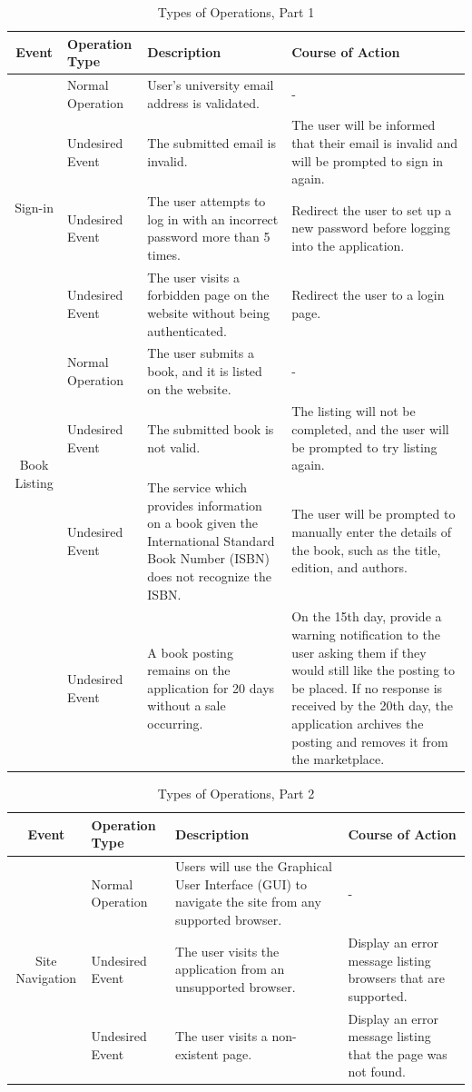 \documentclass[fullpage]{article}
\begin{document}
\begin{table}[H]
\flushleft
\begin{tabular}{|c|p{3cm}|p{4cm}|p{4cm}|}
\hline
 \rowcolor{lightgray} 
\textbf{Event} & \textbf{Operation Type} &\textbf{Description} &\textbf{Course of Action}\\
\hline
\multirow{4}{*}{Sign-in} & Normal Operation & User’s university email address is validated. & -\\
& Undesired Event & The submitted email is invalid. & The user will be informed that their email is invalid and will be prompted to sign in again.\\
& Undesired Event & The user attempts to log in with an incorrect password more than 5 times. & Redirect the user to set up a new password before logging into the application.\\
& Undesired Event & The user visits a forbidden page on the website without being authenticated. & Redirect the user to a login page.\\
\hline
\multirow{3}{*}{Book Listing}& Normal Operation &The user submits a book, and it is listed on the website.&-\\
& Undesired Event &The submitted book is not valid.&The listing will not be completed, and the user will be prompted to try listing again.\\
& Undesired Event &The service which provides information on a book given the International Standard Book Number (ISBN) does not recognize the ISBN.& The user will be prompted to manually enter the details of the book, such as the title, edition, and authors.\\
& Undesired Event &A book posting remains on the application for 20 days without a sale occurring. & On the 15th day, provide a warning notification to the user asking them if they would still like the posting to be placed. If no response is received by the 20th day, the application archives the posting and removes it from the marketplace.\\
\hline
\end{tabular}
\caption{Types of Operations, Part 1}
\end{table}
\begin{table}[H]
\flushleft
\begin{tabular}{|c|p{3cm}|p{4cm}|p{4cm}|}
\hline
 \rowcolor{lightgray} 
\textbf{Event} & \textbf{Operation Type} &\textbf{Description} &\textbf{Course of Action}\\
\hline
\multirow{3}{*}{Site Navigation}& Normal Operation &Users will use the Graphical User Interface (GUI) to navigate the site from any supported browser.&-\\
& Undesired Event &The user visits the application from an unsupported browser.& Display an error message listing browsers that are supported.\\
& Undesired Event &The user visits a non-existent page.&Display an error message listing that the page was not found.\\
\hline
\end{tabular}
\caption{Types of Operations, Part 2}
\end{table}
\end{document}
